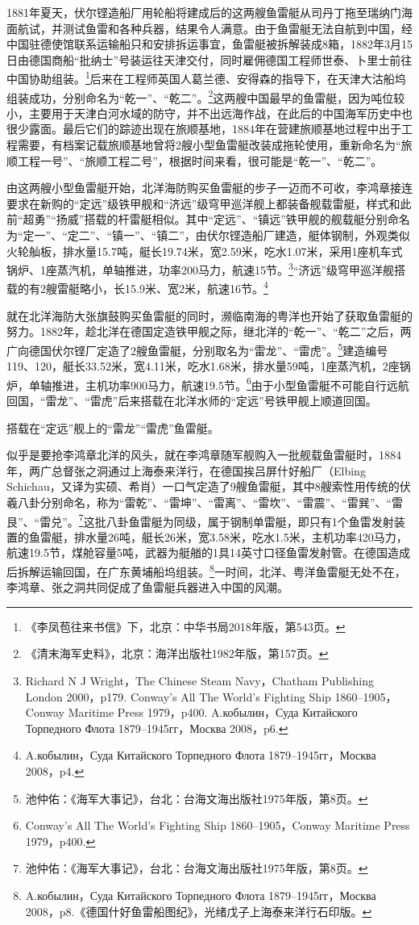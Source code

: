 \documentclass[12pt,UTF8]{ctexbook}
\begin{document}
1881年夏天，伏尔铿造船厂用轮船将建成后的这两艘鱼雷艇从司丹丁拖至瑞纳门海面航试，并测试鱼雷和各种兵器，结果令人满意。由于鱼雷艇无法自航到中国，经中国驻德使馆联系运输船只和安排拆运事宜，鱼雷艇被拆解装成8箱，1882年3月15日由德国商船“批纳士”号装运往天津交付，同时雇佣德国工程师世泰、卜里士前往中国协助组装。\footnote{《李凤苞往来书信》下，北京：中华书局2018年版，第543页。}后来在工程师英国人葛兰德、安得森的指导下，在天津大沽船坞组装成功，分别命名为“乾一”、“乾二”。\footnote{《清末海军史料》，北京：海洋出版社1982年版，第157页。}这两艘中国最早的鱼雷艇，因为吨位较小，主要用于天津白河水域的防守，并不出远海作战，在此后的中国海军历史中也很少露面。最后它们的踪迹出现在旅顺基地，1884年在营建旅顺基地过程中出于工程需要，有档案记载旅顺基地曾将2艘小型鱼雷艇改装成拖轮使用，重新命名为“旅顺工程一号”、“旅顺工程二号”，根据时间来看，很可能是“乾一”、“乾二”。

由这两艘小型鱼雷艇开始，北洋海防购买鱼雷艇的步子一迈而不可收，李鸿章接连要求在新购的“定远”级铁甲舰和“济远”级穹甲巡洋舰上都装备舰载雷艇，样式和此前“超勇”“扬威”搭载的杆雷艇相似。其中“定远”、“镇远”铁甲舰的舰载艇分别命名为“定一”、“定二”、“镇一”、“镇二”，由伏尔铿造船厂建造，艇体钢制，外观类似火轮舢板，排水量15.7吨，艇长19.74米，宽2.59米，吃水1.07米，采用1座机车式锅炉、1座蒸汽机，单轴推进，功率200马力，航速15节。\footnote{Richard N J Wright，The Chinese Steam Navy，Chatham Publishing London 2000，p179. Conway's All The World's Fighting Ship 1860--1905，Conway Maritime Press 1979，p400. \cyrillicfont A.кобылин，Суда Китайского Торпедного Флота 1879--1945гг，Москва 2008，p6.}“济远”级穹甲巡洋舰搭载的有2艘雷艇略小，长15.9米、宽2米，航速16节。\footnote{\cyrillicfont A.кобылин，Суда Китайского Торпедного Флота 1879--1945гг，Москва 2008，p4.}

就在北洋海防大张旗鼓购买鱼雷艇的同时，濒临南海的粤洋也开始了获取鱼雷艇的努力。1882年，趁北洋在德国定造铁甲舰之际，继北洋的“乾一”、“乾二”之后，两广向德国伏尔铿厂定造了2艘鱼雷艇，分别取名为“雷龙”、“雷虎”。\footnote{池仲佑：《海军大事记》，台北：台海文海出版社1975年版，第8页。}建造编号119、120，艇长33.52米，宽4.11米，吃水1.68米，排水量59吨，1座蒸汽机，2座锅炉，单轴推进，主机功率900马力，航速19.5节。\footnote{Conway's All The World's Fighting Ship 1860--1905，Conway Maritime Press 1979，p400.}由于小型鱼雷艇不可能自行远航回国，“雷龙”、“雷虎”后来搭载在北洋水师的“定远”号铁甲舰上顺道回国。

搭载在“定远”舰上的“雷龙”“雷虎”鱼雷艇。

似乎是要抢李鸿章北洋的风头，就在李鸿章随军舰购入一批舰载鱼雷艇时，1884年，两广总督张之洞通过上海泰来洋行，在德国挨吕屏什好船厂（Elbing Schichau，又译为实硕、希肖）一口气定造了9艘鱼雷艇，其中8艘索性用传统的伏羲八卦分别命名，称为“雷乾”、“雷坤”、“雷离”、“雷坎”、“雷震”、“雷巽”、“雷艮”、“雷兑”。\footnote{池仲佑：《海军大事记》，台北：台海文海出版社1975年版，第8页。}这批八卦鱼雷艇为同级，属于钢制单雷艇，即只有1个鱼雷发射装置的鱼雷艇，排水量26吨，艇长26米，宽3.58米，吃水1.5米，主机功率420马力，航速19.5节，煤舱容量5吨，武器为艇艏的1具14英寸口径鱼雷发射管。在德国造成后拆解运输回国，在广东黄埔船坞组装。\footnote{\cyrillicfont A.кобылин，Суда Китайского Торпедного Флота 1879--1945гг，Москва 2008，p8.《德国什好鱼雷船图纪》，光绪戊子上海泰来洋行石印版。}一时间，北洋、粤洋鱼雷艇无处不在，李鸿章、张之洞共同促成了鱼雷艇兵器进入中国的风潮。
\end{document}
